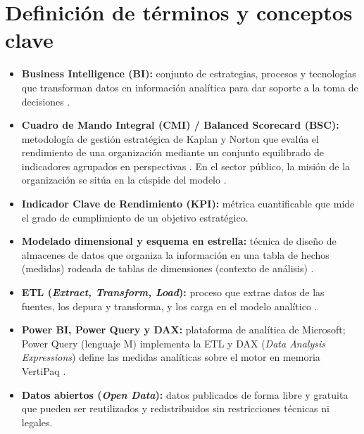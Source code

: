 \documentclass[12pt, a4paper, oneside]{report}
\begin{document}
\section{Definición de términos y conceptos clave}
\begin{itemize}
    \item \textbf{Business Intelligence (BI):} conjunto de estrategias, procesos y tecnologías que transforman datos en información analítica para dar soporte a la toma de decisiones \cite{sharda2014business}.
    \item \textbf{Cuadro de Mando Integral (CMI) / Balanced Scorecard (BSC):} metodología de gestión estratégica de Kaplan y Norton que evalúa el rendimiento de una organización mediante un conjunto equilibrado de indicadores agrupados en perspectivas \cite{kaplan1992balanced}. En el sector público, la misión de la organización se sitúa en la cúspide del modelo \cite{niven2008balanced}.
    \item \textbf{Indicador Clave de Rendimiento (KPI):} métrica cuantificable que mide el grado de cumplimiento de un objetivo estratégico.
    \item \textbf{Modelado dimensional y esquema en estrella:} técnica de diseño de almacenes de datos que organiza la información en una tabla de hechos (medidas) rodeada de tablas de dimensiones (contexto de análisis) \cite{kimball2013data}.
    \item \textbf{ETL (\textit{Extract, Transform, Load}):} proceso que extrae datos de las fuentes, los depura y transforma, y los carga en el modelo analítico \cite{kimball2013data}.
    \item \textbf{Power BI, Power Query y DAX:} plataforma de analítica de Microsoft; Power Query (lenguaje M) implementa la ETL y DAX (\textit{Data Analysis Expressions}) define las medidas analíticas sobre el motor en memoria VertiPaq \cite{ferrari2019definitive}.
    \item \textbf{Datos abiertos (\textit{Open Data}):} datos publicados de forma libre y gratuita que pueden ser reutilizados y redistribuidos sin restricciones técnicas ni legales.
\end{itemize}
\end{document}
